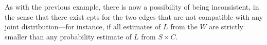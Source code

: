 \documentclass{article}
\numberwithin{equation}{section}
\begin{document}
\begin{example}
		As with the previous example, there is now a possibility of being
		inconsistent, in the sense that there exist cpts for the two edges
		that are not compatible with any joint distribution---for instance, if
		all estimates of $L$ from the $W$ are strictly smaller than any
		probability estimate of $L$ from $S \times C$. 
%	
	\end{example}
	
\end{document}
